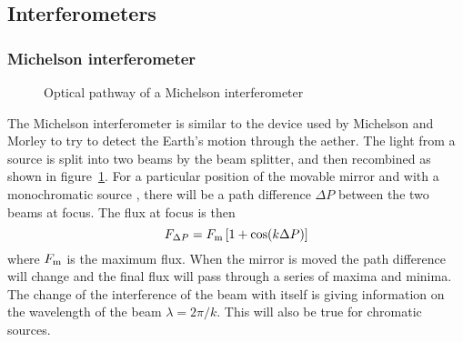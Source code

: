 \documentclass{article}
\begin{document}
\subsection{Interferometers}

\subsubsection{Michelson interferometer}

\begin{figure}[h]
  \centering  {}
  \caption{Optical pathway of a Michelson interferometer}
  \label{fig:michelson-interferometer}
\end{figure}

The Michelson interferometer is similar to the device used by Michelson and Morley to
try to detect the Earth's motion through the aether. The light from a source is split
into two beams by the beam splitter, and then recombined as shown in figure~\ref{fig:michelson-interferometer}. For a particular position of the movable mirror
and with a monochromatic source , there will be a path difference $\Delta P$ between the
two beams at focus. The flux at focus is then
\[
F_{\Delta P}=F_{\rm m}\left[1+\cos(k\Delta P)\right]
\]
where $F_{\rm m}$ is the maximum flux. When the mirror is moved the path difference will change and the final flux will pass through a series of maxima and minima. The change of the interference of the beam with itself is giving information on the wavelength of the beam $\lambda={2\pi/k}$. This will also be true for chromatic sources.
\end{document}
